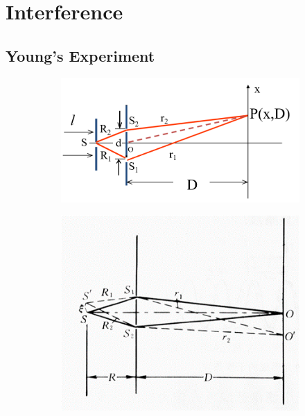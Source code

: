 \chapter{Interference}

\section{Young's Experiment}

\begin{figure}[H]
  \centering
  \begin{subfigure}{.55\textwidth}
    \centering
    \includegraphics[width=\linewidth]{figures/Young-Exp}
  \end{subfigure}
  \begin{subfigure}{.35\textwidth}
    \centering
    \includegraphics[width=\linewidth]{figures/Young-Exp-2}
  \end{subfigure}
\end{figure}

